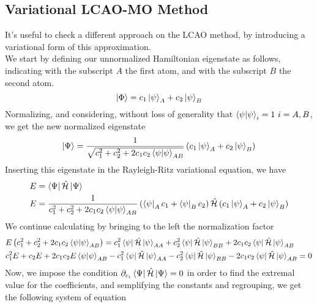 \documentclass[../qm.tex]{subfiles}
\begin{document}
	\subsection{Variational LCAO-MO Method}
	It's useful to check a different approach on the LCAO method, by introducing a variational form of this approximation.\\
	We start by defining our unnormalized Hamiltonian eigenstate as follows, indicating with the subscript $A$ the first atom, and with the subscript $B$ the second atom.\\
	\begin{equation}
		\ket{\Phi}=c_1\ket{\psi}_A+c_2\ket{\psi}_B
		\label{eq:unnormalizedvarLCAO}
	\end{equation}
	Normalizing, and considering, without loss of generality that $\braket{\psi}_i=1\ i=A,B$, we get the new normalized eigenstate
	\begin{equation}
		\ket{\Psi}=\frac{1}{\sqrt{c_1^2+c_2^2+2c_1c_2\bra{\psi}\ket{\psi}_{AB}}}\left( c_1\ket{\psi}_A+c_2\ket{\psi}_B \right)
		\label{eq:normalizedeigenstate}
	\end{equation}
	Inserting this eigenstate in the Rayleigh-Ritz variational equation, we have
	\begin{equation*}
		\begin{aligned}
			E&=\bra{\Psi}\hat{\mathcal{H}}\ket{\Psi}\\
			E&=\frac{1}{c_1^2+c_2^2+2c_1c_2\braket{\psi}_{AB}}\left( \bra{\psi}_Ac_1+\bra{\psi}_Bc_2 \right)\hat{\mathcal{H}}\left( c_1\ket{\psi}_A+c_2\ket{\psi}_B \right)
		\end{aligned}
	\end{equation*}
	We continue calculating by bringing to the left the normalization factor
	\begin{equation*}
		\begin{aligned}
			&E\left( c_1^2+c_2^2+2c_1c_2\braket{\psi}_{AB} \right)=c_1^2\bra{\psi}\hat{\mathcal{H}}\ket{\psi}_{AA}+c_2^2\bra{\psi}\hat{\mathcal{H}}\ket{\psi}_{BB}+2c_1c_2\bra{\psi}\hat{\mathcal{H}}\ket{\psi}_{AB}\\
			&c_1^2E+c_2E+2c_1c_2E\braket{\psi}_{AB}-c_1^2\bra{\psi}\hat{\mathcal{H}}\ket{\psi}_{AA}-c_2^2\bra{\psi}\hat{\mathcal{H}}\ket{\psi}_{BB}-2c_1c_2\bra{\psi}\hat{\mathcal{H}}\ket{\psi}_{AB}=0
	\end{aligned}
	\end{equation*}
	Now, we impose the condition $\partial_{c_i}\bra{\Psi}\hat{\mathcal{H}}\ket{\Psi}=0$ in order to find the extremal value for the coefficients, and semplifying the constants and regrouping, we get the following system of equation
\end{document}
